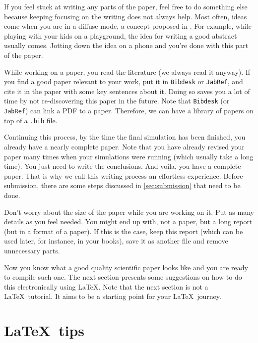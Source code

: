 \documentclass[authoryear,12pta4paper,fleqn]{article}
\numberwithin{equation}{section}
\theoremstyle{remark}
\begin{document}
If you feel stuck at writing any parts of the paper, feel free to do something else because keeping focusing on the writing does not always help. Most often, ideas come when you are in a diffuse mode, a concept proposed in \cite{Oakley:2018a}. For example, while playing with your kids on a playground, the idea for writing a good abstract usually comes. Jotting down the idea on a phone and you're done with this part of the paper.

While working on a paper, you read the literature (we always read it anyway). If you find a good paper relevant to your work, put it in \texttt{Bibdesk} or \texttt{JabRef}, and cite it in the paper with some key sentences about it. Doing so saves you a lot of time by not re-discovering this paper in the future. Note that \texttt{Bibdesk} (or \texttt{JabRef}) can link a PDF to a paper. Therefore, we can have a library of papers on top of a \texttt{.bib} file. 

Continuing this process, by the time the final simulation has been finished, you already have a nearly complete paper. Note that you have already revised your paper many times when your simulations were running (which usually take a long time).
You just need to write the conclusions. And voila, you have a complete paper. That is why we call this writing process an effortless experience.
Before submission, there are some steps discussed in \cref{sec:submission} that need to be done.

Don't worry about the size of the paper while you are working on it. Put as many details as you feel needed. You might end up with, not a paper, but a long report (but in a format of a paper). If this is the case, keep this report (which can be used later, for instance, in your books), save it as another  file and remove unnecessary parts.

Now you know what a good quality scientific paper looks like and you are ready to compile such one. The next section presents some suggestions on how to do this electronically using \LaTeX. Note that the next section is not a \LaTeX\ tutorial. It aims to be a starting point for your \LaTeX\ journey.

% 


\section{\LaTeX\ tips}\label{sec:latex}
\end{document}
